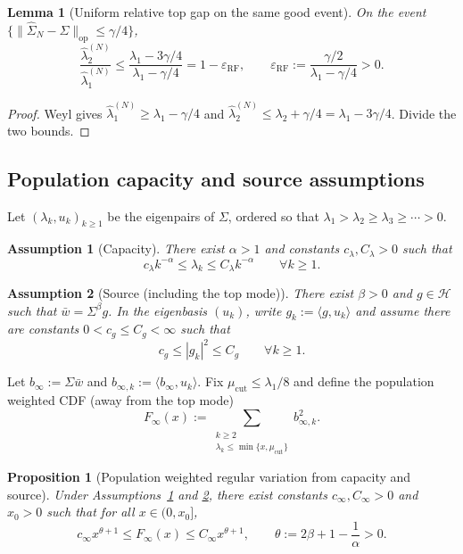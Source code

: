 \documentclass[11pt]{article}
\newtheorem{lemma}{Lemma}
\newtheorem{assumption}{Assumption}
\newtheorem{proposition}{Proposition}
\begin{document}
\begin{lemma}[Uniform relative top gap on the same good event]\label{lem:rf-gap}
On the event $\{\|\widehat\Sigma_N-\Sigma\|_{\mathrm{op}}\le \gamma/4\}$,
\[
\frac{\widehat\lambda_2^{(N)}}{\widehat\lambda_1^{(N)}}
\le
\frac{\lambda_1-3\gamma/4}{\lambda_1-\gamma/4}
=1-\varepsilon_{\mathrm{RF}},
\qquad
\varepsilon_{\mathrm{RF}}:=\frac{\gamma/2}{\lambda_1-\gamma/4}>0.
\]
\end{lemma}

\begin{proof}
Weyl gives $\widehat\lambda_1^{(N)}\ge \lambda_1-\gamma/4$ and
$\widehat\lambda_2^{(N)}\le \lambda_2+\gamma/4=\lambda_1-3\gamma/4$. Divide the two bounds.
\end{proof}

\subsection{Population capacity and source assumptions}\label{subsec:cap-source}

Let $(\lambda_k,u_k)_{k\ge 1}$ be the eigenpairs of $\Sigma$, ordered so that
$\lambda_1>\lambda_2\ge\lambda_3\ge\cdots>0$.

\begin{assumption}[Capacity]\label{ass:cap}
There exist $\alpha>1$ and constants $c_\lambda,C_\lambda>0$ such that
\[
c_\lambda k^{-\alpha} \le \lambda_k \le C_\lambda k^{-\alpha}
\qquad \forall k\ge 1.
\]
\end{assumption}

\begin{assumption}[Source (including the top mode)]\label{ass:source}
There exist $\beta>0$ and $g\in\mathcal H$ such that $\bar w = \Sigma^\beta g$.
In the eigenbasis $(u_k)$, write $g_k:=\langle g,u_k\rangle$ and assume there are constants
$0<c_g\le C_g<\infty$ such that
\[
c_g \le |g_k|^2 \le C_g
\qquad \forall k\ge 1.
\]
\end{assumption}

Let $b_\infty:=\Sigma\bar w$ and $b_{\infty,k}:=\langle b_\infty,u_k\rangle$.
Fix $\mu_{\mathrm{cut}}\le \lambda_1/8$ and define the population weighted CDF (away from the top mode)
\[
F_\infty(x)
:=\sum_{\substack{k\ge 2\\ \lambda_k\le \min\{x,\mu_{\mathrm{cut}}\}}}
b_{\infty,k}^2.
\]

\begin{proposition}[Population weighted regular variation from capacity and source]\label{prop:pop-wRV}
Under Assumptions~\ref{ass:cap} and \ref{ass:source}, there exist constants
$c_\infty,C_\infty>0$ and $x_0>0$ such that for all $x\in(0,x_0]$,
\[
c_\infty x^{\theta+1}\le F_\infty(x)\le C_\infty x^{\theta+1},
\qquad
\theta:=2\beta+1-\frac{1}{\alpha}>0.
\]
\end{proposition}
\end{document}

